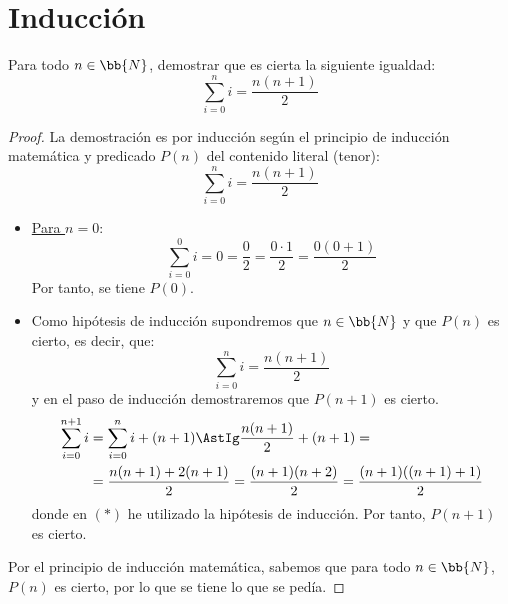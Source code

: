 \section{Inducción}

\begin{ejercicio}\label{ej:1.1}
    Para todo $n\in \bb{N}$, demostrar que es cierta la siguiente igualdad:
    \begin{equation*}
        \sum_{i=0}^n i = \dfrac{n(n+1)}{2}
    \end{equation*}
    \begin{proof}
        La demostración es por inducción según el principio de inducción matemática y predicado $P(n)$ del contenido literal (tenor):
        \begin{equation*}
            \sum_{i=0}^n i = \dfrac{n(n+1)}{2}
        \end{equation*}

        \begin{itemize}
            \item \ul{Para $n=0$}:
            \begin{equation*}
                \sum_{i=0}^0 i = 0 = \frac{0}{2} = \frac{0\cdot 1}{2}
                 = \dfrac{0(0+1)}{2}
            \end{equation*}
            Por tanto, se tiene $P(0)$.

            \item Como hipótesis de inducción supondremos que $n\in \bb{N}$ y que $P(n)$ es cierto, es decir, que:
            \begin{equation*}
                \sum_{i=0}^n i = \dfrac{n(n+1)}{2}
            \end{equation*}
            y en el paso de inducción demostraremos que $P(n+1)$ es cierto.
            \begin{align*}
                \sum_{i=0}^{n+1} i &= \sum_{i=0}^n i + (n+1)
                \AstIg \dfrac{n(n+1)}{2} + (n+1)
                =\\&= \dfrac{n(n+1) + 2(n+1)}{2}
                = \dfrac{(n+1)(n+2)}{2}
                = \dfrac{(n+1)((n+1)+1)}{2}
            \end{align*}
            donde en $(\ast)$ he utilizado la hipótesis de inducción. Por tanto, $P(n+1)$ es cierto.
        \end{itemize}

        Por el principio de inducción matemática, sabemos que para todo $n\in \bb{N}$, $P(n)$ es cierto, por lo que se tiene lo que se pedía.
    \end{proof}
\end{ejercicio}

